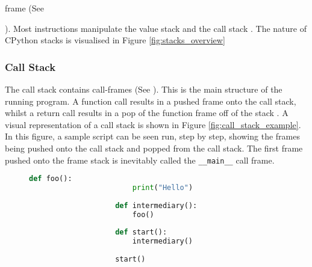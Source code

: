 		frame (See {{\bfseries{}}). Most instructions manipulate the value stack and the call stack \cite[]{general2018stacks}. The nature of CPython stacks is visualised in Figure \ref{fig:stacks_overview}
			\subsubsection*{Call Stack}
			\label{subsubsec:call_stack}

			\par The call stack contains call-frames (See {\bfseries{}}). This is the main structure of the running program.
			A function call results in a pushed frame onto the call stack, whilst 
			a return call results in a pop of the function frame off of the stack \cite[]{call2010stack}. A visual representation of a call stack is shown in Figure \ref{fig:call_stack_example}. 
			In this figure, a sample script can be seen run, step by step, showing the frames being pushed onto the call stack and popped from the call stack.
			The first frame pushed onto the frame stack is inevitably called the \lstinline|__main__| call frame.

			\begin{figure}
				\centering

				\begin{lstlisting}[language=Python,caption=Python script, label=lst:callstackexample]
					def foo():
						print("Hello")
					
					def intermediary():
						foo()
						
					def start():
						intermediary()
					
					start()
				\end{lstlisting}

\end{figure}}
